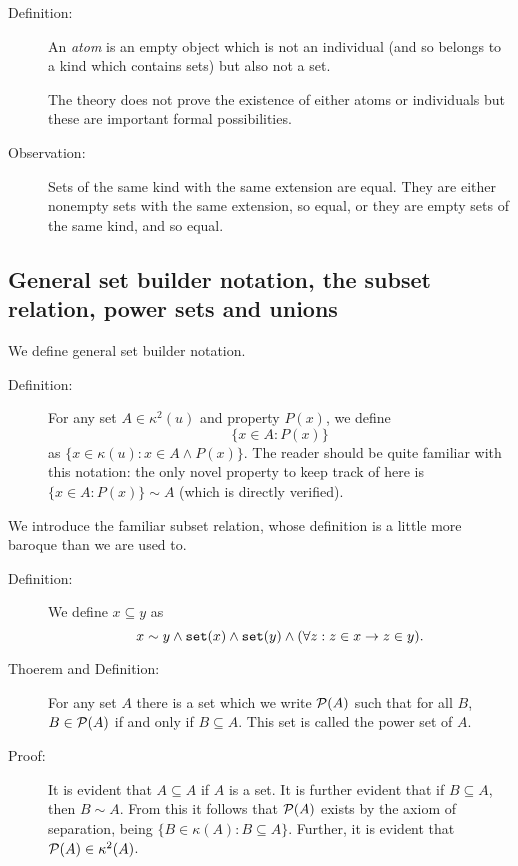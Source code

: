 \documentclass[12pt]{article}
\begin{document}
\begin{description}
\item[Definition:]  An {\em atom\/} is an empty object which is not an individual (and so belongs to a kind which contains sets) but also not a set.

The theory does not prove the existence of either atoms or individuals but these are important formal possibilities.

\item[Observation:]   Sets of the same kind with the same extension are equal.  They are either nonempty sets with the same extension, so equal, or they are empty sets of the same kind, and so equal.



\end{description}

\subsection{General set builder notation, the subset relation, power sets and unions}

We define general set builder notation.

\begin{description}

\item[Definition:]  For any set $A\in \kappa^2(u)$ and property $P(x)$, we define $$\{x \in A:P(x)\}$$ as
$\{x \in \kappa(u):x \in A \wedge P(x)\}$.  The reader should be quite familiar with this notation:  the only novel property to keep track of here is $\{x \in A:P(x)\}\sim A$ (which is directly verified).

\end{description}

We introduce the familiar subset relation, whose definition is a little more baroque than we are used to.

\begin{description}

\item[Definition:]  We define $x \subseteq y$ as $$x \sim y \wedge {\tt set}(x) \wedge {\tt set}(y) \wedge (\forall z:z \in x \rightarrow z \in y).$$

\item[Thoerem and Definition:]  For any set $A$ there is a set which we write ${\cal P}(A)$ such that
for all $B$, $B \in {\cal P}(A)$ if and only if $B \subseteq A$.  This set is called the power set of $A$.

\item[Proof:]  It is evident that $A \subseteq A$ if $A$ is a set.  It is further evident that if $B \subseteq A$, then $B \sim A$.  From this it follows that ${\cal P}(A)$ exists by the axiom of separation, being
$\{B \in \kappa(A):B \subseteq A\}$.  Further, it is evident that ${\cal P}(A) \in \kappa^2(A)$.

\end{description}
\end{document}
